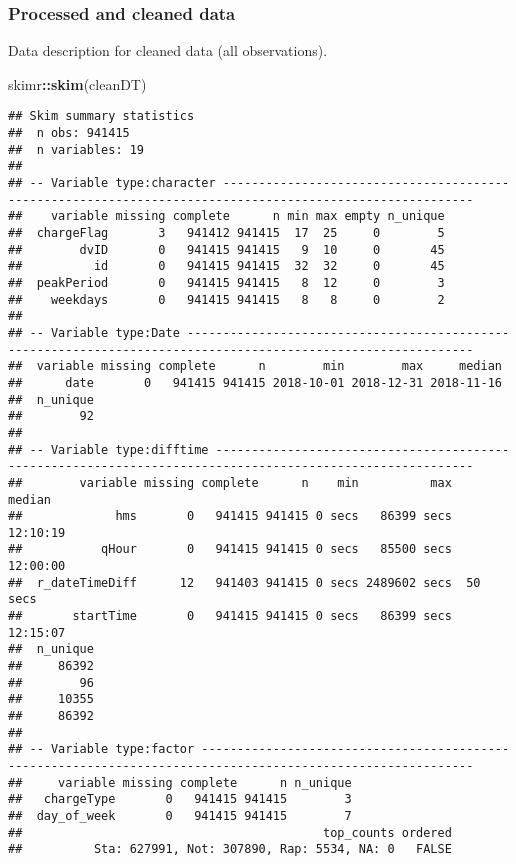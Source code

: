 \documentclass[]{article}
\newenvironment{Shaded}{\begin{snugshade}}{\end{snugshade}}
\newcommand{\KeywordTok}[1]{\textcolor[rgb]{0.13,0.29,0.53}{\textbf{#1}}}
\newcommand{\NormalTok}[1]{#1}
\newcommand{\OperatorTok}[1]{\textcolor[rgb]{0.81,0.36,0.00}{\textbf{#1}}}
\begin{document}
\hypertarget{processedCheck}{%
\subsubsection{Processed and cleaned data}\label{processedCheck}}

Data description for cleaned data (all observations).

\begin{Shaded}
\begin{Highlighting}[]
\NormalTok{skimr}\OperatorTok{::}\KeywordTok{skim}\NormalTok{(cleanDT)}
\end{Highlighting}
\end{Shaded}

\begin{verbatim}
## Skim summary statistics
##  n obs: 941415 
##  n variables: 19 
## 
## -- Variable type:character ---------------------------------------------------------------------------------------------------------
##    variable missing complete      n min max empty n_unique
##  chargeFlag       3   941412 941415  17  25     0        5
##        dvID       0   941415 941415   9  10     0       45
##          id       0   941415 941415  32  32     0       45
##  peakPeriod       0   941415 941415   8  12     0        3
##    weekdays       0   941415 941415   8   8     0        2
## 
## -- Variable type:Date --------------------------------------------------------------------------------------------------------------
##  variable missing complete      n        min        max     median
##      date       0   941415 941415 2018-10-01 2018-12-31 2018-11-16
##  n_unique
##        92
## 
## -- Variable type:difftime ----------------------------------------------------------------------------------------------------------
##        variable missing complete      n    min          max   median
##             hms       0   941415 941415 0 secs   86399 secs 12:10:19
##           qHour       0   941415 941415 0 secs   85500 secs 12:00:00
##  r_dateTimeDiff      12   941403 941415 0 secs 2489602 secs  50 secs
##       startTime       0   941415 941415 0 secs   86399 secs 12:15:07
##  n_unique
##     86392
##        96
##     10355
##     86392
## 
## -- Variable type:factor ------------------------------------------------------------------------------------------------------------
##     variable missing complete      n n_unique
##   chargeType       0   941415 941415        3
##  day_of_week       0   941415 941415        7
##                                          top_counts ordered
##          Sta: 627991, Not: 307890, Rap: 5534, NA: 0   FALSE

\end{verbatim}
\end{document}
